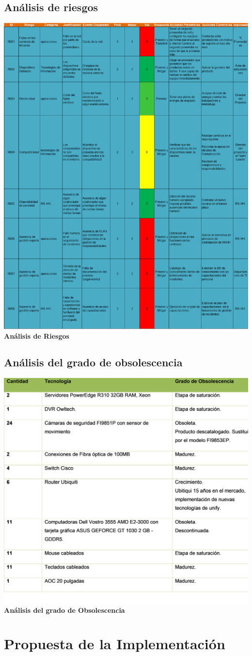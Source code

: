 \documentclass[conference]{IEEEtran}
\begin{document}
\subsection{Análisis de riesgos}

        \begin{center}
            \includegraphics[width=.5\textwidth]{Imagenes/Riesgos.png}
            \textbf {Análisis de Riesgos}
        \end{center}

    \subsection{Análisis del grado de obsolescencia}

        \begin{center}
            \includegraphics[width=.5\textwidth]{Imagenes/Obsolocencia.png}
            \textbf {Análisis del grado de Obsolescencia}
        \end{center}

\section{Propuesta de la Implementación}
\end{document}
